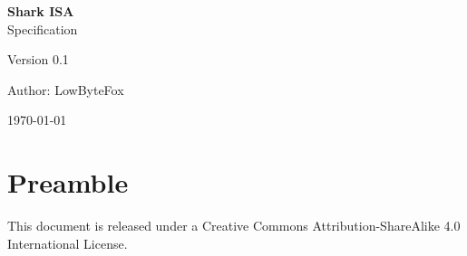 \documentclass[a4paper,12pt]{article}
\begin{document}
\thispagestyle{empty} 

\vspace*{3cm}

\begin{flushright}
    {\fontsize{50pt}{60pt}\selectfont \textbf{Shark ISA}\\ Specification}
\end{flushright}


\vspace{1em}

\begin{flushright}
    {\Large Version 0.1}\par
\end{flushright}

\vfill

\begin{flushright}
    {\large Author: LowByteFox\par}
\end{flushright}

\begin{flushright}
    {\large \today\par}
\end{flushright}

\newpage
\tableofcontents
\newpage
\section{Preamble}
This document is released under a Creative Commons Attribution-ShareAlike 4.0 International License.

\newpage
\end{document}

